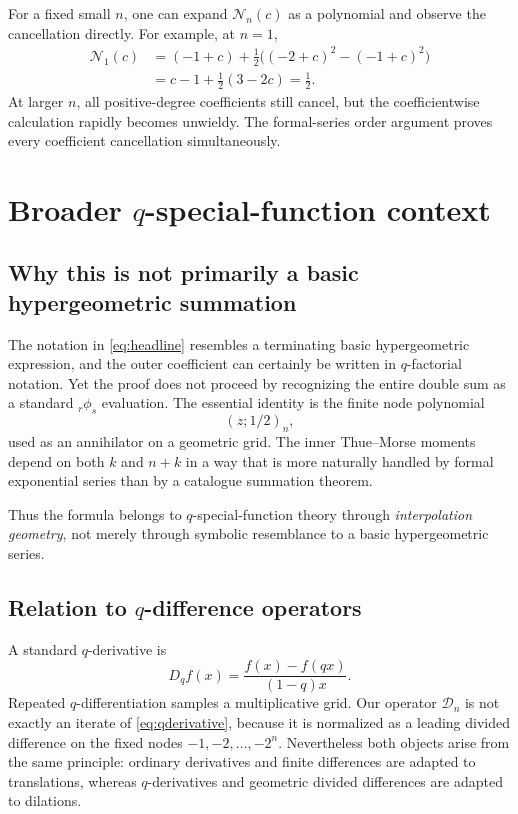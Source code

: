 \documentclass[11pt,oneside]{article}
\theoremstyle{definition}
\theoremstyle{remark}
\newcommand{\qpoch}[3]{\left(#1;#2\right)_{#3}}
\begin{document}
For a fixed small $n$, one can expand $\mathcal N_n(c)$ as a polynomial and
observe the cancellation directly.  For example, at $n=1$,
\begin{align*}
 \mathcal N_1(c)
 &=(-1+c)
 +\frac12\bigl((-2+c)^2-(-1+c)^2\bigr)\\
 &=c-1+\frac12(3-2c)=\frac12.
\end{align*}
At larger $n$, all positive-degree coefficients still cancel, but the
coefficientwise calculation rapidly becomes unwieldy.  The formal-series
order argument proves every coefficient cancellation simultaneously.

\section{Broader \texorpdfstring{$q$-special-function}{q-special-function} context}

\subsection{Why this is not primarily a basic hypergeometric summation}

The notation in \eqref{eq:headline} resembles a terminating basic
hypergeometric expression, and the outer coefficient can certainly be
written in $q$-factorial notation.  Yet the proof does not proceed by
recognizing the entire double sum as a standard ${}_r\phi_s$ evaluation.
The essential identity is the finite node polynomial
\[
 \qpoch{z}{1/2}{n},
\]
used as an annihilator on a geometric grid.  The inner Thue--Morse moments
depend on both $k$ and $n+k$ in a way that is more naturally handled by
formal exponential series than by a catalogue summation theorem.

Thus the formula belongs to $q$-special-function theory through
\emph{interpolation geometry}, not merely through symbolic resemblance to a
basic hypergeometric series.

\subsection{Relation to \texorpdfstring{$q$-difference operators}{q-difference operators}}

A standard $q$-derivative is
\begin{equation}\label{eq:qderivative}
 D_qf(x)=\frac{f(x)-f(qx)}{(1-q)x}.
\end{equation}
Repeated $q$-differentiation samples a multiplicative grid.  Our operator
$\mathcal D_n$ is not exactly an iterate of \eqref{eq:qderivative}, because
it is normalized as a leading divided difference on the fixed nodes
$-1,-2,\ldots,-2^n$.  Nevertheless both objects arise from the same
principle: ordinary derivatives and finite differences are adapted to
translations, whereas $q$-derivatives and geometric divided differences are
adapted to dilations.
\end{document}
